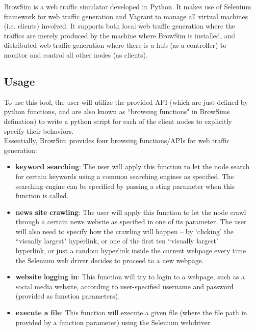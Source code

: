\documentclass[12pt]{report}
\begin{document}
BrowSim \citep{BrowSim} is a web traffic simulator developed in Python. It makes use of Selenium framework for web traffic generation and Vagrant to manage all virtual machines (i.e. clients) involved. It supports both local web traffic generation where the traffics are merely produced by the machine where BrowSim is installed, and distributed web traffic generation where there is a hub (as a controller) to monitor and control all other nodes (as clients).

\subsection{Usage}

To use this tool, the user will utilize the provided API (which are just defined by python functions, and are also known as ``browsing functions" in BrowSim\textquotesingle s defination) to write a python script for each of the client nodes to explicitly specify their behaviors.\\

Essentially, BrowSim provides four browsing functions/APIs for web traffic generation:

\begin{itemize}
\item \textbf{keyword searching}: The user will apply this function to let the node search for certain keywords using a common searching engines as specified. The searching engine can be specified by passing a sting parameter when this function is called.

\item \textbf{news site crawling}: The user will apply this function to let the node crawl through a certain news website as specified in one of its parameter. The user will also need to specify how the crawling will happen -- by ‘clicking’ the ``visually largest" hyperlink, or one of the first ten ``visually largest" hyperlink, or just a random hyperlink inside the current webpage every time the Selenium web driver decides to proceed to a new webpage.

\item \textbf{website logging in}: This function will try to login to a webpage, such as a social media website, according to user-specified username and password (provided as function parameters).

\item \textbf{execute a file}: This function will execute a given file (where the file path in provided by a function parameter) using the Selenium webdriver.

\end{itemize}
\end{document}
